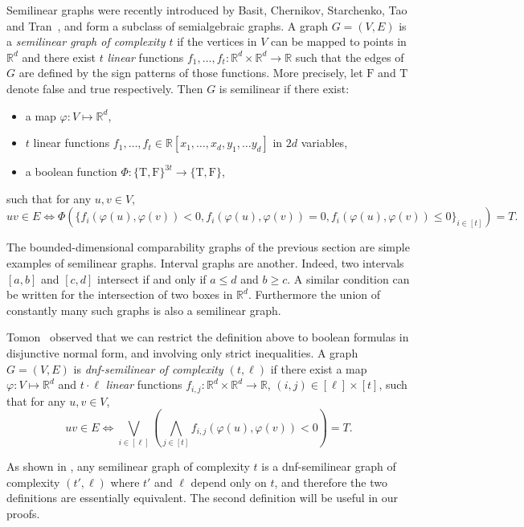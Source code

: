\documentclass{amsart}
\newcommand{\darkblue}{\color{darkblue}} %
\newcommand{\defn}[1]{\textsl{\darkblue #1}} %
\begin{document}
Semilinear graphs were recently introduced by Basit, Chernikov, Starchenko, Tao and Tran~\cite{BCSTT21}, and form a subclass of semialgebraic graphs.
A graph $G=(V,E)$ is a \defn{semilinear graph of complexity $t$} if the vertices in $V$ can be mapped to points in $\mathbb{R}^d$ and there exist $t$ \emph{linear} functions $f_1,\ldots,f_t:\mathbb{R}^d\times \mathbb{R}^d\rightarrow\mathbb{R}$ such that the edges of $G$ are defined by the sign patterns of those functions. More precisely, let $\text{F}$ and $\text{T}$ denote false and true respectively. 
Then $G$ is semilinear if there exist:
\begin{itemize}
\item a map $\varphi: V\mapsto \mathbb{R}^d$,
\item $t$ linear functions $f_1,\ldots, f_t\in \mathbb{R}[x_1,\ldots, x_d, y_1,\ldots y_d]$ in $2d$ variables,
\item a boolean function $\Phi:\{\text{T},\text{F}\}^{3t}\rightarrow \{\text{T},\text{F}\}$,
\end{itemize}
such that for any $u,v \in V$, 
\[
uv \in E \Leftrightarrow
\Phi\left(\{f_i(\varphi(u), \varphi(v))<0,f_i(\varphi(u), \varphi(v))=0,f_i(\varphi(u), \varphi(v))\leq 0\}_{i\in [t]}\right)=T.
\]

The bounded-dimensional comparability graphs of the previous section are simple examples of semilinear graphs. Interval graphs are another. Indeed, two intervals $[a,b]$ and $[c,d]$ intersect if and only if $a\leq d$ and $b\geq c$. A similar condition can be written for the intersection of two boxes in $\mathbb{R}^d$. Furthermore the union of constantly many such graphs is also a semilinear graph.

Tomon~\cite{T23} observed that we can restrict the definition above to boolean formulas in disjunctive normal form, and involving only strict inequalities.
A graph $G=(V,E)$ is \defn{dnf-semilinear of complexity $(t,\ell)$} if there exist a map $\varphi: V\mapsto \mathbb{R}^d$ and $t\cdot \ell$ {\em linear} functions $f_{i, j}:\mathbb{R}^d\times \mathbb{R}^d\rightarrow\mathbb{R}$, $(i,j)\in [\ell]\times [t]$, such that for any $u, v \in V$,
\begin{equation}
uv \in E \Leftrightarrow
\bigvee_{i\in [\ell]} \left(\bigwedge_{j\in [t]} f_{i, j}(\varphi(u), \varphi(v))<0 \right)=T.
\end{equation}

As shown in \cite{T23}, any semilinear graph of complexity $t$ is a dnf-semilinear graph of complexity $(t',\ell)$ where $t'$ and $\ell$ depend only on $t$, and therefore the two definitions are essentially equivalent.
The second definition will be useful in our proofs.
\end{document}
